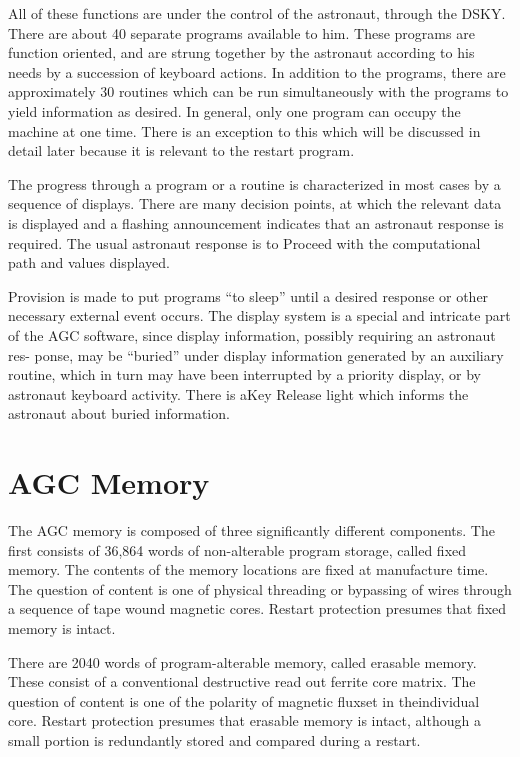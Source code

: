 \documentclass[oxford]{ahsan}
\begin{document}
All of these functions are under the control of the astronaut, through the DSKY.
There are about 40 separate programs available to him. These programs are
function oriented, and are strung together by the astronaut according to his
needs by a succession of keyboard actions. In addition to the programs, there
are approximately 30 routines which can be run simultaneously with the programs
to yield information as desired. In general, only one program can occupy the
machine at one time. There is an exception to this which will be discussed in
detail later because it is relevant to the restart program.

The progress through a program or a routine is characterized in most cases by a
sequence of displays. There are many decision points, at which the relevant data is
displayed and a flashing announcement indicates that an astronaut response is required.
The usual astronaut response is to Proceed with the computational path and values
displayed.

Provision is made to put programs “to sleep” until a desired response or other
necessary external event occurs. The display system is a special and intricate
part of the AGC software, since display information, possibly requiring an
astronaut res- ponse, may be “buried” under display information generated by an
auxiliary routine, which in turn may have been interrupted by a priority
display, or by astronaut keyboard activity. There is aKey  Release light which
informs the astronaut about buried information.


\section{AGC Memory}

The AGC memory is composed of three significantly different components. The first
consists of 36,864 words of non-alterable program storage, called fixed memory. The
contents of the memory locations are fixed at manufacture time. The question of content
is one of physical threading or bypassing of wires through a sequence of tape wound
magnetic cores. Restart protection presumes that fixed memory is intact.

There are 2040 words of program-alterable memory, called erasable memory. These consist
of a conventional destructive read out ferrite core matrix. The question of content is
one of the polarity of magnetic fluxset  in theindividual core. Restart protection
presumes that erasable memory is intact, although a small portion is redundantly stored
and compared during a restart.
\end{document}
